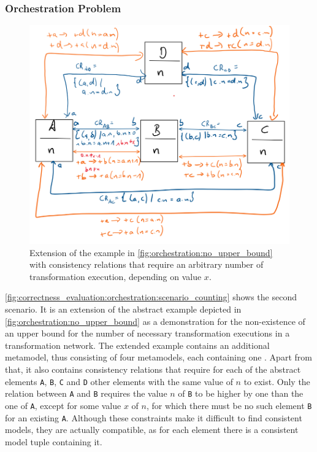 

\subsubsection*{Orchestration Problem}

\begin{figure}
    \centering
    \includegraphics[width=\textwidth]{figures/correctness/evaluation/orchestration_scenario_counting.png}
    \caption[Example scenario with arbitrary execution bound]{Extension of the example in \autoref{fig:orchestration:no_upper_bound} with consistency relations that require an arbitrary number of transformation execution, depending on value $x$.}
    \label{fig:correctness_evaluation:orchestration:scenario_counting}
\end{figure}

\autoref{fig:correctness_evaluation:orchestration:scenario_counting} shows the second scenario.
It is an extension of the abstract example depicted in \autoref{fig:orchestration:no_upper_bound} as a demonstration for the non-existence of an upper bound for the number of necessary transformation executions in a transformation network.
The extended example contains an additional metamodel, thus consisting of four metamodels, each containing one \metaclass. 
Apart from that, it also contains consistency relations that require for each of the abstract elements \texttt{A}, \texttt{B}, \texttt{C} and \texttt{D} other elements with the same value of $n$ to exist.
Only the relation between \texttt{A} and \texttt{B} requires the value $n$ of \texttt{B} to be higher by one than the one of \texttt{A}, except for some value $x$ of $n$, for which there must be no such element \texttt{B} for an existing \texttt{A}.
Although these constraints make it difficult to find consistent models, they are actually compatible, as for each element there is a consistent model tuple containing it.

